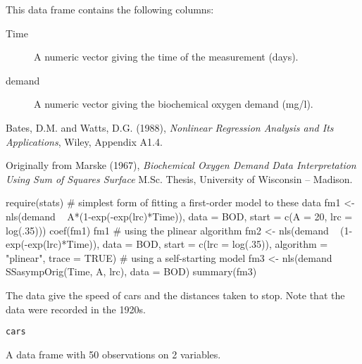 %
\begin{Format}
This data frame contains the following columns:
\begin{description}

\item[Time] 
A numeric vector giving the time of the measurement (days).

\item[demand] 
A numeric vector giving the biochemical oxygen demand (mg/l).


\end{description}

\end{Format}
%
\begin{Source}\relax
Bates, D.M. and Watts, D.G. (1988),
\emph{Nonlinear Regression Analysis and Its Applications},
Wiley, Appendix A1.4.

Originally from Marske (1967), \emph{Biochemical
Oxygen Demand Data Interpretation Using Sum of Squares Surface}
M.Sc. Thesis, University of Wisconsin -- Madison.
\end{Source}
%
\begin{Examples}
\begin{ExampleCode}

require(stats)
# simplest form of fitting a first-order model to these data
fm1 <- nls(demand ~ A*(1-exp(-exp(lrc)*Time)), data = BOD,
   start = c(A = 20, lrc = log(.35)))
coef(fm1)
fm1
# using the plinear algorithm
fm2 <- nls(demand ~ (1-exp(-exp(lrc)*Time)), data = BOD,
   start = c(lrc = log(.35)), algorithm = "plinear", trace = TRUE)
# using a self-starting model
fm3 <- nls(demand ~ SSasympOrig(Time, A, lrc), data = BOD)
summary(fm3)

\end{ExampleCode}
\end{Examples}
%
\begin{Description}\relax
The data give the speed of cars and the distances taken to stop.
Note that the data were recorded in the 1920s.
\end{Description}
%
\begin{Usage}
\begin{verbatim}
cars
\end{verbatim}
\end{Usage}
%
\begin{Format}
A data frame with 50 observations on 2 variables.

\end{Format}
